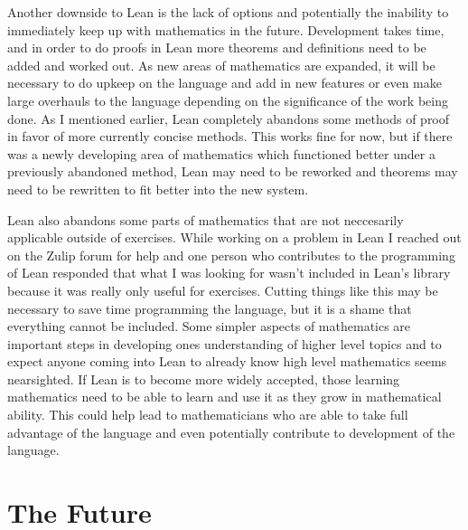 \documentclass[
  letterpaper,
]{scrreprt}
\theoremstyle{remark}
\begin{document}
Another downside to Lean is the lack of options and potentially the
inability to immediately keep up with mathematics in the future.
Development takes time, and in order to do proofs in Lean more theorems
and definitions need to be added and worked out. As new areas of
mathematics are expanded, it will be necessary to do upkeep on the
language and add in new features or even make large overhauls to the
language depending on the significance of the work being done. As I
mentioned earlier, Lean completely abandons some methods of proof in
favor of more currently concise methods. This works fine for now, but if
there was a newly developing area of mathematics which functioned better
under a previously abandoned method, Lean may need to be reworked and
theorems may need to be rewritten to fit better into the new system.

Lean also abandons some parts of mathematics that are not neccesarily
applicable outside of exercises. While working on a problem in Lean I
reached out on the Zulip forum for help and one person who contributes
to the programming of Lean responded that what I was looking for wasn't
included in Lean's library because it was really only useful for
exercises. Cutting things like this may be necessary to save time
programming the language, but it is a shame that everything cannot be
included. Some simpler aspects of mathematics are important steps in
developing ones understanding of higher level topics and to expect
anyone coming into Lean to already know high level mathematics seems
nearsighted. If Lean is to become more widely accepted, those learning
mathematics need to be able to learn and use it as they grow in
mathematical ability. This could help lead to mathematicians who are
able to take full advantage of the language and even potentially
contribute to development of the language.

\hypertarget{the-future}{%
\section{The Future}\label{the-future}}
\end{document}

